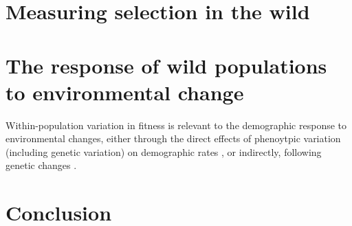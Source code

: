 \section{Measuring selection in the wild}




\section{The response of wild populations to environmental change}


Within-population variation in fitness is relevant to the demographic response to environmental changes, either through the direct effects of phenoytpic variation (including genetic variation) on demographic rates \parencite{Kendall2011, vindenes2015, Plard2016}, or indirectly, following genetic changes \parencite{Chevin2010a, Turcotte2011, Schiffers2013a}. 

\section{Conclusion}


\printbibliography[heading=subbibliography]

